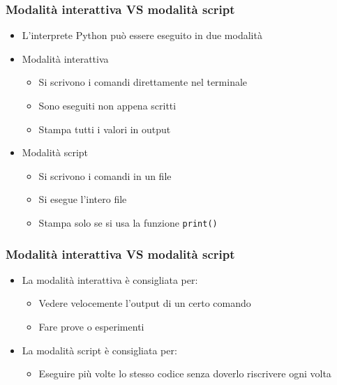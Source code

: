 \begin{contentframe}
    \frametitle{Modalità interattiva VS modalità script}

    \begin{itemize}
        \item L'interprete Python può essere eseguito in due modalità

        \bigskip
        \item Modalità interattiva
        \begin{itemize}
            \item Si scrivono i comandi direttamente nel terminale
            \item Sono eseguiti non appena scritti
            \item Stampa tutti i valori in output
        \end{itemize}

        \bigskip
        \item Modalità script
        \begin{itemize}
            \item Si scrivono i comandi in un file
            \item Si esegue l'intero file
            \item Stampa solo se si usa la funzione \texttt{print()}
        \end{itemize}
    \end{itemize}
\end{contentframe}

\begin{contentframe}
    \frametitle{Modalità interattiva VS modalità script}

    \begin{itemize}
        \item La modalità interattiva è consigliata per:
        \begin{itemize}
            \item Vedere velocemente l'output di un certo comando
            \item Fare prove o esperimenti
        \end{itemize}

        \bigskip
        \item La modalità script è consigliata per:
        \begin{itemize}
            \item Eseguire più volte lo stesso codice senza doverlo riscrivere ogni volta
        \end{itemize}
    \end{itemize}
\end{contentframe}


